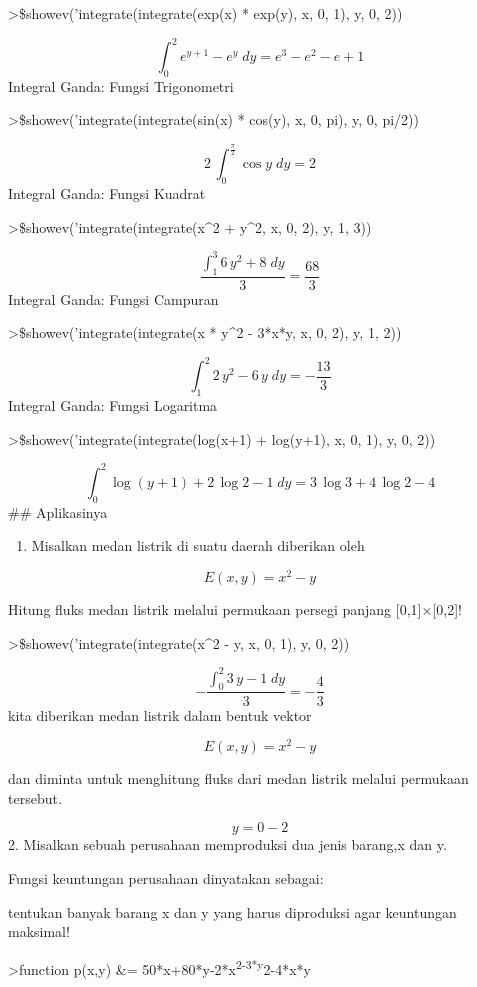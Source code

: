 \documentclass[
]{book}
\providecommand{\tightlist}{%
  \setlength{\itemsep}{0pt}\setlength{\parskip}{0pt}}
\begin{document}
\textgreater\$showev('integrate(integrate(exp(x) * exp(y), x, 0, 1), y, 0, 2))

\[\int_{0}^{2}{e^{y+1}-e^{y}\;dy}=e^3-e^2-e+1\]Integral Ganda: Fungsi Trigonometri

\textgreater\$showev('integrate(integrate(sin(x) * cos(y), x, 0, pi), y, 0, pi/2))

\[2\,\int_{0}^{\frac{\pi}{2}}{\cos y\;dy}=2\]Integral Ganda: Fungsi Kuadrat

\textgreater\$showev('integrate(integrate(x\^{}2 + y\^{}2, x, 0, 2), y, 1, 3))

\[\frac{\int_{1}^{3}{6\,y^2+8\;dy}}{3}=\frac{68}{3}\]Integral Ganda: Fungsi Campuran

\textgreater\$showev('integrate(integrate(x * y\^{}2 - 3*x*y, x, 0, 2), y, 1, 2))

\[\int_{1}^{2}{2\,y^2-6\,y\;dy}=-\frac{13}{3}\]Integral Ganda: Fungsi Logaritma

\textgreater\$showev('integrate(integrate(log(x+1) + log(y+1), x, 0, 1), y, 0, 2))

\[\int_{0}^{2}{\log \left(y+1\right)+2\,\log 2-1\;dy}=3\,\log 3+4\,  \log 2-4\]\#\# Aplikasinya

\begin{enumerate}
\def\labelenumi{\arabic{enumi}.}
\tightlist
\item
  Misalkan medan listrik di suatu daerah diberikan oleh
\end{enumerate}

\[E(x,y)=x^2 - y\]

Hitung fluks medan listrik melalui permukaan persegi panjang {[}0,1{]}×{[}0,2{]}!

\textgreater\$showev('integrate(integrate(x\^{}2 - y, x, 0, 1), y, 0, 2))

\[-\frac{\int_{0}^{2}{3\,y-1\;dy}}{3}=-\frac{4}{3}\]kita diberikan medan listrik dalam bentuk vektor

\[E(x,y)=x^2-y\]

dan diminta untuk menghitung fluks dari medan listrik melalui permukaan tersebut.

\[y=0-2\]2. Misalkan sebuah perusahaan memproduksi dua jenis barang,x dan y.

Fungsi keuntungan perusahaan dinyatakan sebagai:

tentukan banyak barang x dan y yang harus diproduksi agar keuntungan maksimal!

\textgreater function p(x,y) \&= 50*x+80*y-2*x\textsuperscript{2-3*y}2-4*x*y
\end{document}

